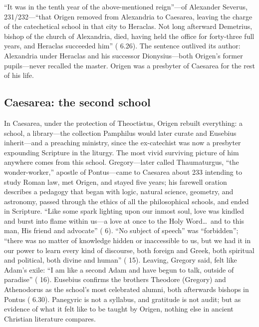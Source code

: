 ``It was in the tenth year of the above-mentioned reign''---of Alexander
Severus, 231/232---``that Origen removed from Alexandria to Caesarea,
leaving the charge of the catechetical school in that city to Heraclas. Not
long afterward Demetrius, bishop of the church of Alexandria, died, having
held the office for forty-three full years, and Heraclas succeeded him''
( 6.26). The sentence outlived its author: Alexandria
under Heraclas and his successor Dionysius---both Origen's former
pupils---never recalled the master. Origen was a presbyter of Caesarea for
the rest of his life.

\subsection{Caesarea: the second school}

In Caesarea, under the protection of Theoctistus, Origen rebuilt everything:
a school, a library---the collection Pamphilus would later curate and
Eusebius inherit---and a preaching ministry, since the ex-catechist was now
a presbyter expounding Scripture in the liturgy. The most vivid surviving
picture of him anywhere comes from this school. Gregory---later called
Thaumaturgus, ``the wonder-worker,'' apostle of Pontus---came to Caesarea
about 233 intending to study Roman law, met Origen, and stayed five years;
his farewell oration describes a pedagogy that began with logic, natural
science, geometry, and astronomy, passed through the ethics of all the
philosophical schools, and ended in Scripture. ``Like some spark lighting
upon our inmost soul, love was kindled and burst into flame within us---a
love at once to the Holy Word\ldots\ and to this man, His friend and
advocate'' ( 6). ``No
subject of speech'' was ``forbidden''; ``there was no matter of knowledge
hidden or inaccessible to us, but we had it in our power to learn every kind
of discourse, both foreign and Greek, both spiritual and political, both
divine and human'' ( 15). Leaving, Gregory said, felt like
Adam's exile: ``I am like a second Adam and have begun to talk, outside of
paradise'' ( 16). Eusebius confirms the brothers Theodore
(Gregory) and Athenodorus as the school's most celebrated alumni, both
afterwards bishops in Pontus ( 6.30). Panegyric is not
a syllabus, and gratitude is not audit; but as evidence of what it felt like
to be taught by Origen, nothing else in ancient Christian literature
compares.

